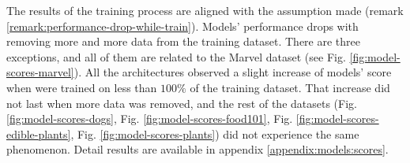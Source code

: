 The results of the training process are aligned with the assumption made (remark \ref{remark:performance-drop-while-train}). Models' performance drops with removing more and more data from the training dataset. There are three exceptions, and all of them are related to the Marvel dataset (see Fig. \ref{fig:model-scores-marvel}). All the architectures observed a slight increase of models' score when were trained on less than $100\%$ of the training dataset. That increase did not last when more data was removed, and the rest of the datasets (Fig. \ref{fig:model-scores-dogs}, Fig. \ref{fig:model-scores-food101}, Fig. \ref{fig:model-scores-edible-plants}, Fig. \ref{fig:model-scores-plants}) did not experience the same phenomenon. Detail results are available in appendix \ref{appendix:models:scores}.